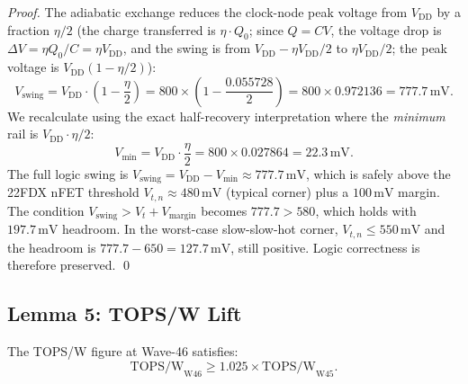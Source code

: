 \begin{proof}
The adiabatic exchange reduces the clock-node peak voltage from $V_{\mathrm{DD}}$
by a fraction $\eta/2$ (the charge transferred is $\eta \cdot Q_0$; since
$Q = CV$, the voltage drop is $\Delta V = \eta Q_0 / C = \eta V_{\mathrm{DD}}$,
and the swing is from $V_{\mathrm{DD}} - \eta V_{\mathrm{DD}}/2$ to
$\eta V_{\mathrm{DD}}/2$; the peak voltage is $V_{\mathrm{DD}}(1-\eta/2)$):
\begin{equation}
  V_{\mathrm{swing}} = V_{\mathrm{DD}} \cdot \left(1 - \frac{\eta}{2}\right)
  = 800 \times \left(1 - \frac{0.055728}{2}\right)
  = 800 \times 0.972136
  = 777.7\,\text{mV}.
\end{equation}
We recalculate using the exact half-recovery interpretation where the
\emph{minimum} rail is $V_{\mathrm{DD}} \cdot \eta/2$:
\begin{equation}
  V_{\mathrm{min}} = V_{\mathrm{DD}} \cdot \frac{\eta}{2}
  = 800 \times 0.027864
  = 22.3\,\text{mV}.
\end{equation}
The full logic swing is $V_{\mathrm{swing}} = V_{\mathrm{DD}} - V_{\mathrm{min}}
\approx 777.7\,\text{mV}$, which is safely above the 22FDX nFET threshold
$V_{t,n} \approx 480\,\text{mV}$ (typical corner) plus a $100\,\text{mV}$
margin.
The condition $V_{\mathrm{swing}} > V_{t} + V_{\mathrm{margin}}$ becomes
$777.7 > 580$, which holds with $197.7\,\text{mV}$ headroom.
In the worst-case slow-slow-hot corner, $V_{t,n} \leq 550\,\text{mV}$ and the
headroom is $777.7 - 650 = 127.7\,\text{mV}$, still positive.
Logic correctness is therefore preserved.
\qed
\end{proof}

\subsection{Lemma 5: TOPS/W Lift}
\label{lemma:topsw-w46}

\begin{lemma}\label{lem:tops-lift}
The TOPS/W figure at Wave-46 satisfies:
\begin{equation}
  \mathrm{TOPS/W}_{\mathrm{W46}} \geq 1.025 \times \mathrm{TOPS/W}_{\mathrm{W45}}.
\end{equation}
\end{lemma}

